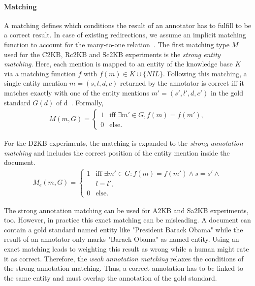 
\paragraph{Matching}

A matching defines which conditions the result of an annotator has to fulfill to be a correct result.
In case of existing redirections, we assume an implicit matching function to account for the many-to-one relation~\cite{cornolti}.
The first matching type $M$ used for the C2KB, Rc2KB and Sc2KB experiments is the \textit{strong entity matching}.
Here, each mention is mapped to an entity of the knowledge base $K$ via a matching function $f$ with $f(m) \in K \cup \{NIL\}$.
Following this matching, a single entity mention $m = (s, l, d, c)$ returned by the annotator is correct iff it matches exactly with one of the entity mentions $m' = (s', l', d, c')$ in the gold standard $G(d)$ of d~\cite{cornolti}. Formally,
\begin{align}
M(m,G)=
\begin{cases}
1 &  \text{iff }\exists m' \in G, f(m) = f(m'), \\
0 & \text{else.}
\end{cases}
\end{align}

For the D2KB experiments, the matching is expanded to the \textit{strong annotation matching} and includes the correct position of the entity mention inside the document.
\begin{align}
M_e(m,G) =
\begin{cases}
1 &  \text{iff }\exists m' \in G: f(m) = f(m') \wedge s = s' \wedge \\
  &l = l', \\
0 & \text{else.}
\end{cases}
\end{align}

The strong annotation matching can be used for A2KB and Sa2KB experiments, too.
However, in practice this exact matching can be misleading.
A document can contain a gold standard named entity like "President Barack Obama" while the result of an annotator only marks "Barack Obama" as named entity.
Using an exact matching leads to weighting this result as wrong while a human might rate it as correct.
Therefore, the \textit{weak annotation matching} relaxes the conditions of the strong annotation matching.
Thus, a correct annotation has to be linked to the same entity and must overlap the annotation of the gold standard.


